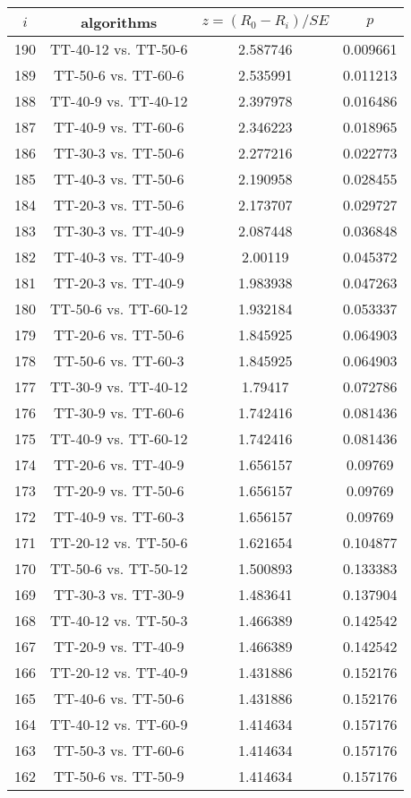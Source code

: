 \documentclass[a4paper,10pt]{article}
\begin{document}
\begin{landscape}
\begin{table}[!htp]
\centering\scriptsize
\begin{tabular}{cccc}
$i$&algorithms&$z=(R_0 - R_i)/SE$&$p$\\
\hline190&TT-40-12 vs. TT-50-6&2.587746&0.009661\\
189&TT-50-6 vs. TT-60-6&2.535991&0.011213\\
188&TT-40-9 vs. TT-40-12&2.397978&0.016486\\
187&TT-40-9 vs. TT-60-6&2.346223&0.018965\\
186&TT-30-3 vs. TT-50-6&2.277216&0.022773\\
185&TT-40-3 vs. TT-50-6&2.190958&0.028455\\
184&TT-20-3 vs. TT-50-6&2.173707&0.029727\\
183&TT-30-3 vs. TT-40-9&2.087448&0.036848\\
182&TT-40-3 vs. TT-40-9&2.00119&0.045372\\
181&TT-20-3 vs. TT-40-9&1.983938&0.047263\\
180&TT-50-6 vs. TT-60-12&1.932184&0.053337\\
179&TT-20-6 vs. TT-50-6&1.845925&0.064903\\
178&TT-50-6 vs. TT-60-3&1.845925&0.064903\\
177&TT-30-9 vs. TT-40-12&1.79417&0.072786\\
176&TT-30-9 vs. TT-60-6&1.742416&0.081436\\
175&TT-40-9 vs. TT-60-12&1.742416&0.081436\\
174&TT-20-6 vs. TT-40-9&1.656157&0.09769\\
173&TT-20-9 vs. TT-50-6&1.656157&0.09769\\
172&TT-40-9 vs. TT-60-3&1.656157&0.09769\\
171&TT-20-12 vs. TT-50-6&1.621654&0.104877\\
170&TT-50-6 vs. TT-50-12&1.500893&0.133383\\
169&TT-30-3 vs. TT-30-9&1.483641&0.137904\\
168&TT-40-12 vs. TT-50-3&1.466389&0.142542\\
167&TT-20-9 vs. TT-40-9&1.466389&0.142542\\
166&TT-20-12 vs. TT-40-9&1.431886&0.152176\\
165&TT-40-6 vs. TT-50-6&1.431886&0.152176\\
164&TT-40-12 vs. TT-60-9&1.414634&0.157176\\
163&TT-50-3 vs. TT-60-6&1.414634&0.157176\\
162&TT-50-6 vs. TT-50-9&1.414634&0.157176\\

\end{tabular}
\end{table}
\end{landscape}
\end{document}
